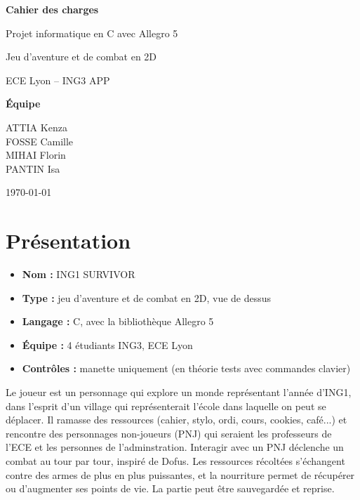 \documentclass[11pt,a4paper]{article}
\begin{document}
\begin{titlepage}
    \centering
    \vspace*{3cm}
    {\Huge\bfseries\color{principal} Cahier des charges\par}
    \vspace{0.8cm}
    {\Large Projet informatique en C avec Allegro 5\par}
    \vspace{0.4cm}
    {\large Jeu d'aventure et de combat en 2D\par}
    \vspace{2.5cm}
    {\large ECE Lyon -- ING3 APP\par}
    \vspace{1.5cm}
    {\large\bfseries Équipe\par}
    \vspace{0.3cm}
    {\large ATTIA Kenza\\ FOSSE Camille\\ MIHAI Florin\\ PANTIN Isa\par}
    \vfill
    {\large \today\par}
\end{titlepage}

\tableofcontents
\newpage

\section{Présentation}

\begin{itemize}
    \item \textbf{Nom :} ING1 SURVIVOR
    \item \textbf{Type :} jeu d'aventure et de combat en 2D, vue de dessus
    \item \textbf{Langage :} C, avec la bibliothèque Allegro 5
    \item \textbf{Équipe :} 4 étudiants ING3, ECE Lyon
    \item \textbf{Contrôles :} manette uniquement (en théorie tests avec commandes clavier)
\end{itemize}

Le joueur est un personnage qui explore un monde représentant l'année d'ING1, dans l'esprit d'un village qui représenterait l'école dans laquelle on peut se déplacer. Il ramasse des ressources (cahier, stylo, ordi, cours, cookies, café...) et rencontre des personnages non-joueurs (PNJ) qui seraient les professeurs de l'ECE et les personnes de l'adminstration. Interagir avec un PNJ déclenche un combat au tour par tour, inspiré de Dofus. Les ressources récoltées s'échangent contre des armes de plus en plus puissantes, et la nourriture permet de récupérer ou d'augmenter ses points de vie. La partie peut être sauvegardée et reprise.
\end{document}
